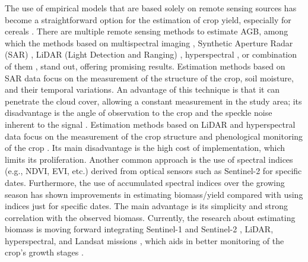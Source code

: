 \documentclass[
  british,
]{interact}
\begin{document}
The use of empirical models that are based solely on remote sensing
sources has become a straightforward option for the estimation of crop
yield, especially for cereals \citep{Lischeid2022}. There are multiple
remote sensing methods to estimate AGB, among which the methods based on
multispectral imaging \citep{Marshall2022, Segarra2022}, Synthetic
Aperture Radar (SAR) \citep{Hu2024, Chao2019}, LiDAR (Light Detection
and Ranging) \citep{Bates2021}, hyperspectral \citep{Yue2021}, or
combination of them \citep{Li2024, David2022, Wang2016}, stand out,
offering promising results. Estimation methods based on SAR data focus
on the measurement of the structure of the crop, soil moisture, and
their temporal variations. An advantage of this technique is that it can
penetrate the cloud cover, allowing a constant measurement in the study
area; its disadvantage is the angle of observation to the crop and the
speckle noise inherent to the signal
\citep{Lopes1990, Maghsoudi2012, Moran1997}. Estimation methods based on
LiDAR and hyperspectral data focus on the measurement of the crop
structure and phenological monitoring of the crop
\citep{Brovkina2017, Luo2017, Wang2016}. Its main disadvantage is the
high cost of implementation, which limits its proliferation. Another
common approach is the use of spectral indices (e.g., NDVI, EVI, etc.)
derived from optical sensors such as Sentinel-2 \citep{David2022} for
specific dates. Furthermore, the use of accumulated spectral indices
\citep{PeroniVenancio2020} over the growing season has shown
improvements in estimating biomass/yield compared with using indices
just for specific dates. The main advantage is its simplicity and strong
correlation with the observed biomass. Currently, the research about
estimating biomass is moving forward integrating Sentinel-1 and
Sentinel-2 \citep{Uribeetxebarria2023}, LiDAR, hyperspectral, and
Landsat missions \citep{Zhang2023, He2018}, which aids in better
monitoring of the crop's growth stages \citep{Shen2023}.
\end{document}
